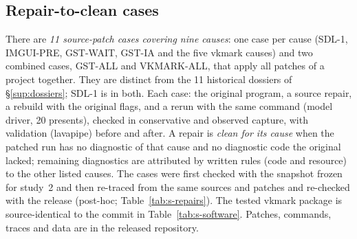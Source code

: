 \subsection{Repair-to-clean cases}
\label{sup:repairs}
There are \emph{11 source-patch cases covering nine causes}: one case per cause (SDL-1, IMGUI-PRE, GST-WAIT, GST-IA and
the five vkmark causes) and two combined cases, GST-ALL and VKMARK-ALL, that apply all patches of a project together.
They are distinct from the 11 historical dossiers of \S\ref{sup:dossiers}; SDL-1 is in both. Each case: the original
program, a source repair, a rebuild with the original flags, and a rerun with the same command (model driver, 20
presents), checked in conservative and observed capture, with validation (lavapipe) before and after.
A repair is \emph{clean for its cause} when the patched run has no diagnostic of that cause and no diagnostic code the
original lacked; remaining diagnostics are attributed by written rules (code and resource) to the other listed causes.
The cases were first checked with the snapshot frozen for study~2 and then re-traced from the same sources and patches
and re-checked with the release (post-hoc; Table~\ref{tab:s-repairs}). The tested vkmark package is source-identical to the commit in Table~\ref{tab:s-software}. Patches, commands, traces and data are in the released repository.

